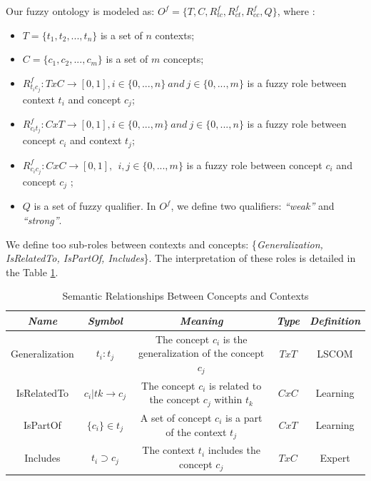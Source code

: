 						Our fuzzy ontology is modeled as:
						$O^{f} = \{T, C, R^{f}_{tc}, R^{f}_{ct}, R^{f}_{cc}, Q\}$, 
							where : 
							\begin{itemize} 
							\item $T = \{t_{1}, t_{2}, ..., t_{n}\}$ is a set of $n$ contexts; 
							\item $C = \{c_{1}, c_{2}, ..., c_{m}\}$ is a set of $m$ concepts; 
							\item $R^{f}_{t_{i}c_{j}} : TxC  \rightarrow [0,1], i 
								\in \{0, ..., n\}~and~j \in \{0, ..., m\}$ is a 
								fuzzy role between context $t_{i}$ and concept $c_{j}$; 
							\item $R^{f}_{c_{i}t_{j}} : CxT  \rightarrow [0,1], i 
								\in \{0, ..., m\}~and~j \in \{0, ..., n\}$ is a 
									fuzzy role between concept $c_{i}$ and context $t_{j}$; 
							\item $R^{f}_{c_{i}c_{j}} : CxC \rightarrow [0,1], ~~ i, j 
								\in \{0, ..., m\}$ is a 
								fuzzy role between concept $c_{i}$ and concept $c_{j}$ ;		 
							\item $Q$ is a set of fuzzy qualifier. In $O^{f}$, 
							we define two qualifiers: \textit{“weak”} and \textit{“strong”}. 
							\end{itemize} 
						We define too sub-roles between contexts and concepts: 
						\{\textit{Generalization, IsRelatedTo, IsPartOf, Includes}\}. 
						The interpretation of these roles is detailed in the Table \ref{table1.1}. 
						\begin{table}[h!] 
							\caption{Semantic Relationships Between Concepts and Contexts} 
							\label{table1.1} 
							\begin{center} 
							\begin{footnotesize} 
							\begin{tabular}{c|c|c|c|c} 
								\hline\textbf{ \textit{Name}} & \textbf{\textit{Symbol}} & 
								\textbf{\textit{Meaning}} & \textbf{\textit{Type}} & 
								\textbf{\textit{Definition}} \\ 
					
								\hline Generalization & $t_{i}:t_{j} $ & 
								The concept $c_{i}$ is the generalization of the concept $c_{j} $ 
				 				&  $TxT$  & LSCOM \\ 
								
								\hline IsRelatedTo 	& $c_{i} |t{k}\rightarrow c_{j}$ &
								The concept $c_{i}$ is related to the concept $c_{j}$ within $t_{k}$ 
				 				& $CxC$  & Learning \\ 
					
								\hline IsPartOf 	& $\{c_{i}\} \in t_{j}	$ & 
								A set of concept $c_{i}$ is a part of the context $t_{j}$ 
								& $CxT$ & Learning \\ 
					
								\hline Includes 	& $t_{i} \supset c_{j}$	& 
								The context $t_{i}$ includes the concept $c_{j}$ 
				 				&  $TxC$ & Expert \\ 
								\hline 
							\end{tabular} 
							\end{footnotesize} 
							\end{center} 
						\end{table} 

